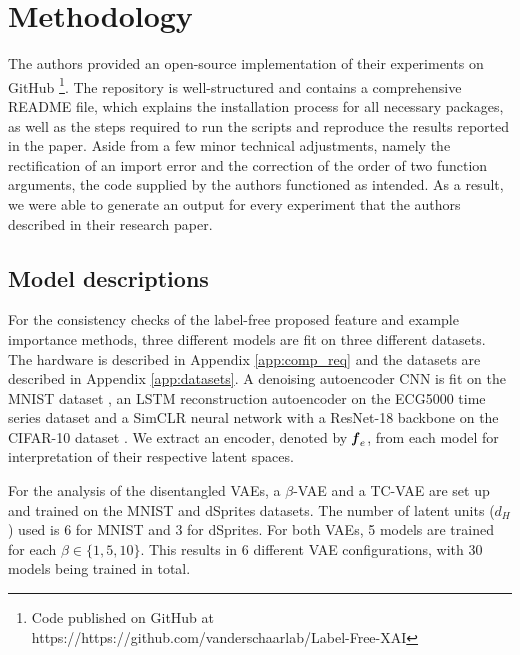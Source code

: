 \section{Methodology}

The authors provided an open-source implementation of their experiments on GitHub \footnote{Code 
 published on GitHub at https://https://github.com/vanderschaarlab/Label-Free-XAI}. The repository is well-structured and contains a comprehensive README file, which explains the installation process for all necessary packages, as well as the steps required to run the scripts and reproduce the results reported in the paper. Aside from a few minor technical adjustments, namely the rectification of an import error and the correction of the order of two function arguments, the code supplied by the authors functioned as intended. As a result, we were able to generate an output for every experiment that the authors described in their research paper. 




\subsection{Model descriptions}
\label{sec:model_descriptions}

For the consistency checks of the label-free proposed feature and example importance methods, three different models are fit on three different datasets. The hardware is described in Appendix \ref{app:comp_req} and the datasets are described in Appendix \ref{app:datasets}. A denoising autoencoder CNN is fit on the MNIST dataset \cite{deng2012mnist}, an LSTM reconstruction autoencoder on the ECG5000 time series dataset \cite{goldberger2000physiobank} and a SimCLR \cite{chen2020simple} neural network with a ResNet-18 \cite{he2016deep} backbone on the CIFAR-10 dataset \cite{krizhevsky2009learning}. We extract an encoder, denoted by $\textbf{\textit{f}}_e$, from each model for interpretation of their respective latent spaces.

For the analysis of the disentangled VAEs, a $\beta$-VAE \cite{higgins2016beta} and a TC-VAE \cite{chen2018isolating} are set up and trained on the MNIST and dSprites \cite{dsprites17} datasets. The number of latent units ($d_H$) used is 6 for MNIST and 3 for dSprites. For both VAEs, 5 models are trained for each $\beta \in \{1,5,10\}$. This results in 6 different VAE configurations, with 30 models being trained in total.


